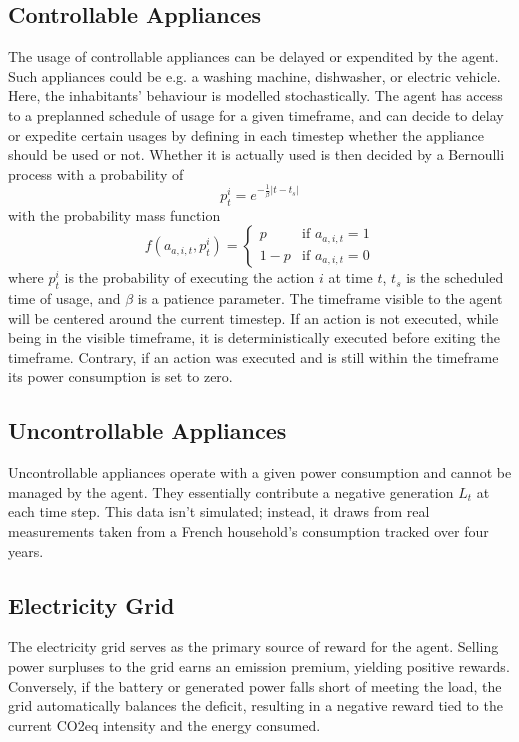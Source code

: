 \documentclass{article}
\theoremstyle{plain}
\theoremstyle{definition}
\theoremstyle{remark}
\begin{document}
\subsection{Controllable Appliances}
The usage of controllable appliances can be delayed or expendited by the agent. Such appliances could be e.g. a washing machine, dishwasher, or electric vehicle. Here, the inhabitants' behaviour is modelled stochastically. The agent has access to a preplanned schedule of usage for a given timeframe, and can decide to delay or expedite certain usages by defining in each timestep whether the appliance should be used or not. Whether it is actually used is then decided by a Bernoulli process with a probability of
    \begin{equation}
        p_t^i = e^{-\frac{1}{\beta} |t - t_s|}
    \end{equation}
    with the probability mass function
    \begin{equation}
        f(a_{a, i, t}, p_t^i) = \begin{cases}
            p & \text{if } a_{a, i, t} = 1 \\
            1 - p & \text{if } a_{a, i, t} = 0
        \end{cases}
    \end{equation}
    where $p_t^i$ is the probability of executing the action $i$ at time $t$, $t_s$ is the scheduled time of usage, and $\beta$ is a patience parameter. The timeframe visible to the agent will be centered around the current timestep. If an action is not executed, while being in the visible timeframe, it is deterministically executed before exiting the timeframe. Contrary, if an action was executed and is still within the timeframe its power consumption is set to zero.

\subsection{Uncontrollable Appliances}
Uncontrollable appliances operate with a given power consumption and cannot be managed by the agent. They essentially contribute a negative generation $L_t$ at each time step. This data isn't simulated; instead, it draws from real measurements taken from a French household's consumption tracked over four years.

\subsection{Electricity Grid}
The electricity grid serves as the primary source of reward for the agent. Selling power surpluses to the grid earns an emission premium, yielding positive rewards. Conversely, if the battery or generated power falls short of meeting the load, the grid automatically balances the deficit, resulting in a negative reward tied to the current CO2eq intensity and the energy consumed.
\end{document}
